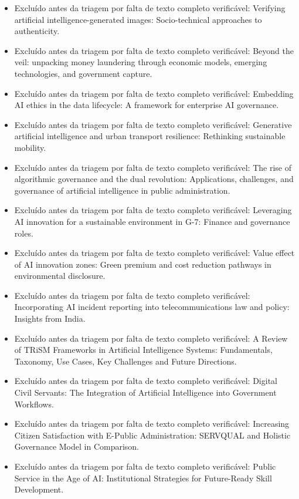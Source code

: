 \documentclass[12pt,a4paper]{article}
\begin{document}
\begin{itemize}
\item Excluído antes da triagem por falta de texto completo verificável: Verifying artificial intelligence-generated images: Socio-technical approaches to authenticity.
\item Excluído antes da triagem por falta de texto completo verificável: Beyond the veil: unpacking money laundering through economic models, emerging technologies, and government capture.
\item Excluído antes da triagem por falta de texto completo verificável: Embedding AI ethics in the data lifecycle: A framework for enterprise AI governance.
\item Excluído antes da triagem por falta de texto completo verificável: Generative artificial intelligence and urban transport resilience: Rethinking sustainable mobility.
\item Excluído antes da triagem por falta de texto completo verificável: The rise of algorithmic governance and the dual revolution: Applications, challenges, and governance of artificial intelligence in public administration.
\item Excluído antes da triagem por falta de texto completo verificável: Leveraging AI innovation for a sustainable environment in G-7: Finance and governance roles.
\item Excluído antes da triagem por falta de texto completo verificável: Value effect of AI innovation zones: Green premium and cost reduction pathways in environmental disclosure.
\item Excluído antes da triagem por falta de texto completo verificável: Incorporating AI incident reporting into telecommunications law and policy: Insights from India.
\item Excluído antes da triagem por falta de texto completo verificável: A Review of TRiSM Frameworks in Artificial Intelligence Systems: Fundamentals, Taxonomy, Use Cases, Key Challenges and Future Directions.
\item Excluído antes da triagem por falta de texto completo verificável: Digital Civil Servants: The Integration of Artificial Intelligence into Government Workflows.
\item Excluído antes da triagem por falta de texto completo verificável: Increasing Citizen Satisfaction with E-Public Administration: SERVQUAL and Holistic Governance Model in Comparison.
\item Excluído antes da triagem por falta de texto completo verificável: Public Service in the Age of AI: Institutional Strategies for Future-Ready Skill Development.

\end{itemize}
\end{document}
